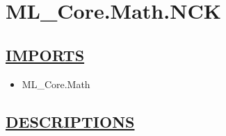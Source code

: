 \chapter*{ML\_Core.Math.NCK}
\hypertarget{ecldoc:toc:ML_Core.Math.NCK}{}

\section*{\underline{IMPORTS}}
\begin{itemize}
\item ML\_Core.Math
\end{itemize}

\section*{\underline{DESCRIPTIONS}}
